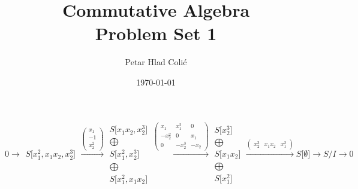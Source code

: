 \documentclass[12pt,a3paper,landscape]{amsart}
\numberwithin{equation}{section}
\theoremstyle{plain}
\theoremstyle{definition}
\begin{document}
\title{Commutative Algebra \\ Problem Set 1}

\author[P. Hlad Coli\'c]{Petar Hlad Coli\'{c}}

\date{\today}


\maketitle

$$
0 \rightarrow \begin{matrix}
S \lbrack x_{1}^{2},x_{1}x_{2},x_{2}^{3} \rbrack
\end{matrix}
\xrightarrow{\left( \begin{matrix}
x_{1} \\
-1 \\
x_{2}^{2}
\end{matrix} \right)}\begin{matrix}
S \lbrack x_{1}x_{2},x_{2}^{3} \rbrack \\ \bigoplus \\
S \lbrack x_{1}^{2},x_{2}^{3} \rbrack \\ \bigoplus \\
S \lbrack x_{1}^{2},x_{1}x_{2} \rbrack
\end{matrix}
\xrightarrow{\left( \begin{matrix}
x_{1} & x_{1}^{2} & 0 \\
-x_{2}^{2} & 0 & x_{1} \\
0 & -x_{2}^{3} & -x_{2}
\end{matrix} \right)}\begin{matrix}
S \lbrack x_{2}^{3} \rbrack \\ \bigoplus \\
S \lbrack x_{1}x_{2} \rbrack \\ \bigoplus \\
S \lbrack x_{1}^{2} \rbrack
\end{matrix}
\xrightarrow{\left( \begin{matrix}
x_{2}^{3} & x_{1}x_{2} & x_{1}^{2}
\end{matrix} \right)}S \lbrack \emptyset \rbrack \rightarrow S/I \rightarrow 0
$$
\end{document}
